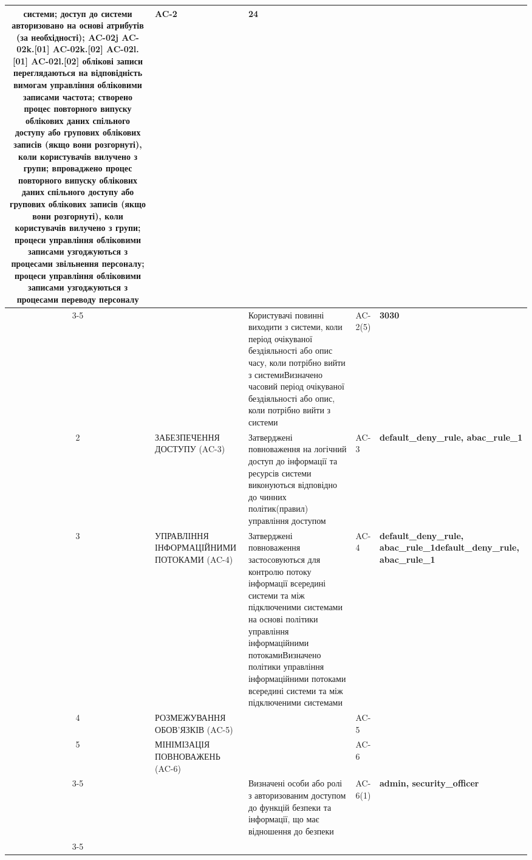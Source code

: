 \documentclass[10pt]{article}
\begin{document}
\begin{longtable}{|c|>{\raggedright\arraybackslash}p{4cm}|>{\raggedright\arraybackslash}p{6cm}|>{\raggedright\arraybackslash}p{2cm}|>{\raggedright\arraybackslash}p{4cm}|}
системи; доступ до системи авторизовано на основі атрибутів (за необхідності); AC-02j AC-02k.[01] AC-02k.[02] AC-02l.[01] AC-02l.[02] облікові записи переглядаються на відповідність вимогам управління обліковими записами частота; створено процес повторного випуску облікових даних спільного доступу або групових облікових записів (якщо вони розгорнуті), коли користувачів вилучено з групи; впроваджено процес повторного випуску облікових даних спільного доступу або групових облікових записів (якщо вони розгорнуті), коли користувачів вилучено з групи; процеси управління обліковими записами узгоджуються з процесами звільнення персоналу; процеси управління обліковими записами узгоджуються з процесами переводу персоналу & AC-2 & \textbf{24} \\ \cline{3-5}
 &  & Користувачі повинні виходити з системи, коли період очікуваної бездіяльності або опис часу, коли потрібно вийти з системи\newline Визначено часовий період очікуваної бездіяльності або опис, коли потрібно вийти з системи & AC-2(5) & \textbf{30}\newline \textbf{30} \\ \hline
2 & ЗАБЕЗПЕЧЕННЯ ДОСТУПУ (AC-3) & Затверджені повноваження на логічний доступ до інформації та ресурсів системи виконуються відповідно до чинних політик(правил) управління доступом & AC-3 & \textbf{default\_\allowbreak{}deny\_\allowbreak{}rule, abac\_\allowbreak{}rule\_\allowbreak{}1} \\ \hline
3 & УПРАВЛІННЯ ІНФОРМАЦІЙНИМИ ПОТОКАМИ (AC-4) & Затверджені повноваження застосовуються для контролю потоку інформації всередині системи та між підключеними системами на основі політики управління інформаційними потоками\newline Визначено політики управління інформаційними потоками всередині системи та між підключеними системами & AC-4 & \textbf{default\_\allowbreak{}deny\_\allowbreak{}rule, abac\_\allowbreak{}rule\_\allowbreak{}1}\newline \textbf{default\_\allowbreak{}deny\_\allowbreak{}rule, abac\_\allowbreak{}rule\_\allowbreak{}1} \\ \hline
4 & РОЗМЕЖУВАННЯ ОБОВ'ЯЗКІВ (AC-5) &  & AC-5 &  \\ \hline
5 & МІНІМІЗАЦІЯ ПОВНОВАЖЕНЬ (AC-6) &  & AC-6 &  \\ \cline{3-5}
 &  & Визначені особи або ролі з авторизованим доступом до функцій безпеки та інформації, що має відношення до безпеки & AC-6(1) & \textbf{admin, security\_\allowbreak{}officer} \\ \cline{3-5}

\end{longtable}
\end{document}
